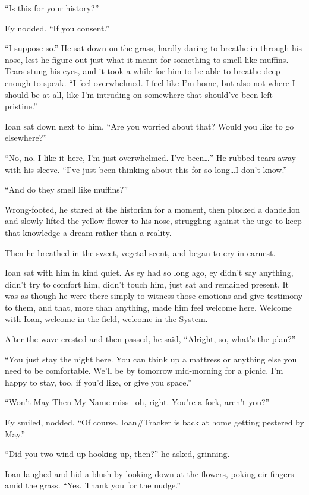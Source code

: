 ``Is this for your history?''

Ey nodded. ``If you consent.''

``I suppose so.'' He sat down on the grass, hardly daring to breathe in through his nose, lest he figure out just what it meant for something to smell like muffins. Tears stung his eyes, and it took a while for him to be able to breathe deep enough to speak. ``I feel overwhelmed. I feel like I'm home, but also not where I should be at all, like I'm intruding on somewhere that should've been left pristine.''

Ioan sat down next to him. ``Are you worried about that? Would you like to go elsewhere?''

``No, no. I like it here, I'm just overwhelmed. I've been\ldots{}'' He rubbed tears away with his sleeve. ``I've just been thinking about this for so long\ldots I don't know.''

``And do they smell like muffins?''

Wrong-footed, he stared at the historian for a moment, then plucked a dandelion and slowly lifted the yellow flower to his nose, struggling against the urge to keep that knowledge a dream rather than a reality.

Then he breathed in the sweet, vegetal scent, and began to cry in earnest.

Ioan sat with him in kind quiet. As ey had so long ago, ey didn't say anything, didn't try to comfort him, didn't touch him, just sat and remained present. It was as though he were there simply to witness those emotions and give testimony to them, and that, more than anything, made him feel welcome here. Welcome with Ioan, welcome in the field, welcome in the System.

After the wave crested and then passed, he said, ``Alright, so, what's the plan?''

``You just stay the night here. You can think up a mattress or anything else you need to be comfortable. We'll be by tomorrow mid-morning for a picnic. I'm happy to stay, too, if you'd like, or give you space.''

``Won't May Then My Name miss-- oh, right. You're a fork, aren't you?''

Ey smiled, nodded. ``Of course. Ioan\#Tracker is back at home getting pestered by May.''

``Did you two wind up hooking up, then?'' he asked, grinning.

Ioan laughed and hid a blush by looking down at the flowers, poking eir fingers amid the grass. ``Yes. Thank you for the nudge.''

